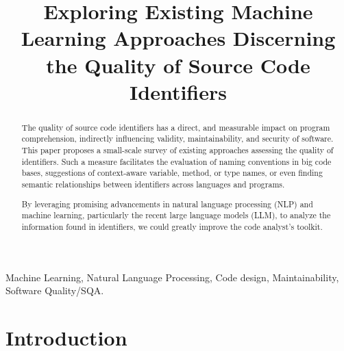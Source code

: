\documentclass[conference]{IEEEtran}
\begin{document}
\title{Exploring Existing Machine Learning Approaches Discerning the Quality of Source
Code Identifiers}

\author{
\and
{}
}

\maketitle

\begin{abstract}
    The quality of source code identifiers has a direct, and measurable impact on program
    comprehension, indirectly influencing validity, maintainability, and security of
    software. This paper proposes a small-scale survey of existing approaches assessing
    the quality of identifiers. Such a measure facilitates the evaluation of naming
    conventions in big code bases, suggestions of context-aware variable, method, or type
    names, or even finding semantic relationships between identifiers across languages and
    programs.

    By leveraging promising advancements in natural language processing (NLP) and machine
    learning, particularly the recent large language models (LLM), to analyze the
    information found in identifiers, we could greatly improve the code analyst's toolkit.
\end{abstract}

\begin{IEEEkeywords}
Machine Learning, Natural Language Processing, Code design, Maintainability, Software
Quality/SQA.
\end{IEEEkeywords}

\section{Introduction}
\label{sec:Introduction}
\end{document}

